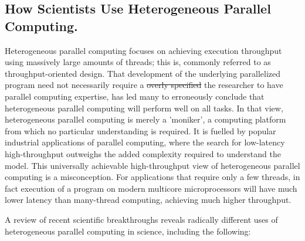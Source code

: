 \documentclass[10pt]{article}[draft]
\begin{document}
\newpage
\begin{center}
	\section{How Scientists Use Heterogeneous Parallel Computing.}
\end{center}
Heterogeneous parallel computing  focuses on achieving execution throughput using massively large amounts of threads; this is, commonly referred to as throughput-oriented design. That development of  the underlying  parallelized program  need not necessarily require a \st{overly specified}  the researcher to have parallel  computing  expertise, has led many to erroneously conclude that heterogeneous parallel computing will perform well on all tasks. In that view, heterogeneous parallel computing  is merely a 'moniker', a computing platform from which no particular understanding is required. It is fuelled by popular industrial applications of parallel computing, where the search for low-latency high-throughput outweighs the added complexity required to understand the model. This universally achievable high-throughput view of heterogeneous parallel computing is a misconception.  For applications that require only a few threads, in fact execution of a program on modern multicore microprocessors will have much lower latency than many-thread computing, achieving much higher throughput.  
	
A review of recent scientific breakthroughs reveals radically different uses of heterogeneous parallel computing in science, including the following:
\end{document}
